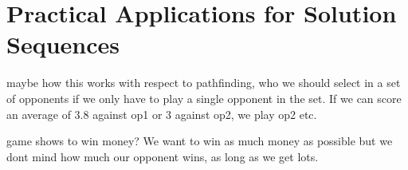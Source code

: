 \chapter{Practical Applications for Solution Sequences}\label{ch:applications}

maybe how this works with respect to pathfinding, who we should select in a set of opponents if we only have to play a single opponent in the set.
If we can score an average of 3.8 against op1 or 3 against op2, we play op2 etc.

game shows to win money?
We want to win as much money as possible but we dont mind how much our opponent wins, as long as we get lots.